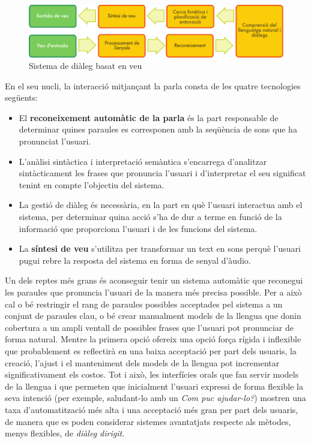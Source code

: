 \begin{multicols}{2}
\begin{figure}[htb]
  \center  \includegraphics[width=\textwidth]{../_media/catalan/simple_speech-based_dialogue_architecture}
  \center
  \caption{Sistema de diàleg basat en veu}
  \label{fig:dialoguearch_ca}
\end{figure}

En el seu nucli, la interacció mitjançant la parla consta de les quatre tecnologies següents:
\begin{itemize}
\item El \textbf{reconeixement automàtic de la parla} és la part responsable de determinar quines paraules es corresponen amb la seqüència de sons que ha pronunciat l’usuari.
\item L’anàlisi sintàctica i interpretació semàntica s’encarrega d’analitzar sintàcticament les frases que pronuncia l’usuari i d’interpretar el seu significat tenint en compte l’objectiu del sistema.
\item La gestió de diàleg és necessària, en la part en què l’usuari interactua amb el sistema, per determinar quina acció s’ha de dur a terme en funció de la informació que proporciona l’usuari i de les funcions del sistema.
\item La \textbf{síntesi de veu} s’utilitza per transformar un text en sons perquè l’usuari pugui rebre la resposta del sistema en forma de senyal d’àudio. 
\end{itemize}

Un dels reptes més grans és aconseguir tenir un sistema automàtic que reconegui les paraules que pronuncia l’usuari de la manera més precisa possible. Per a això cal o bé restringir el rang de paraules possibles acceptades pel sistema a un conjunt de paraules clau, o bé crear manualment models de la llengua que donin cobertura a un ampli ventall de possibles frases que l’usuari pot pronunciar de forma natural. Mentre la primera opció ofereix una opció força rígida i inflexible que probablement es reflectirà en una baixa acceptació per part dels usuaris, la creació, l’ajust i el manteniment dels models de la llengua pot incrementar significativament els costos. Tot i això, les interfícies orals que fan servir models de la llengua i que permeten que inicialment l’usuari expressi de forma flexible la seva intenció (per exemple, saludant-lo amb un \textit{Com puc ajudar-lo?}) mostren una taxa d’automatització més alta i una acceptació més gran per part dels usuaris, de manera que es poden considerar sistemes avantatjats respecte als mètodes, menys flexibles, de \textit{diàleg dirigit}.


\end{multicols}
